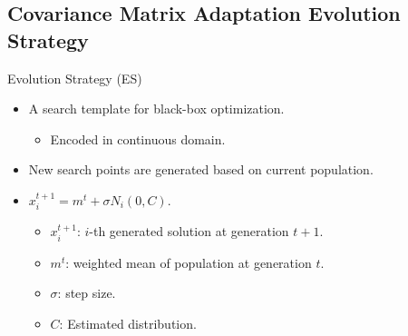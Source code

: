 \subsection{Covariance Matrix Adaptation Evolution Strategy}


\begin{frame}{Evolution Strategy (ES)}
  \begin{itemize}
    \item A search template for black-box optimization.
      \begin{itemize}
        \item Encoded in continuous domain.
      \end{itemize}
      \vspace*{14pt}
    \item New search points are generated based on current population.
      \vspace*{14pt}
    \item $x_i^{t+1} = m^t + \sigma N_i(0,C)$.
      \begin{itemize}
        \item $x_i^{t+1}$: $i$-th generated solution at generation $t+1$.
        \item $m^t$: weighted mean of population at generation $t$.
        \item $\sigma$: step size.
        \item $C$: Estimated distribution.
      \end{itemize}
  \end{itemize}
\end{frame}

